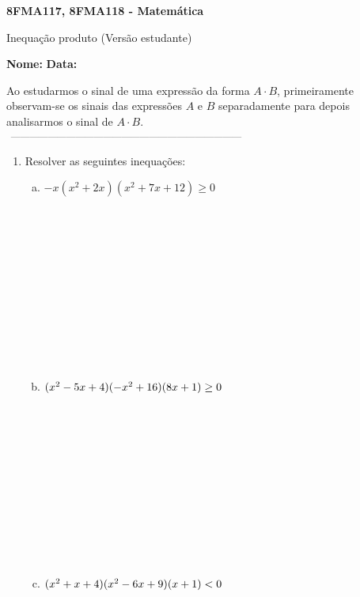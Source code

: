 \documentclass[a4paper,14pt]{article}
\begin{document}
	
	\noindent\textbf{8FMA117, 8FMA118 - Matemática} 
	
	\begin{center}Inequação produto (Versão estudante)
	\end{center}
	
	\noindent\textbf{Nome:} \underline{\hspace{10cm}}
	\noindent\textbf{Data:} \underline{\hspace{4cm}}
	
    \begin{multicols}{2}
    	\noindent Ao estudarmos o sinal de uma expressão da forma $A \cdot B$, primeiramente observam-se os sinais das expressões $A$ e $B$ separadamente para depois analisarmos o sinal de $A \cdot B$. \\
    	\noindent\textsubscript{~---------------------------------------------------------------------------}
    	\begin{enumerate}
    		\item Resolver as seguintes inequações:
    		\begin{enumerate}[a)]
    			\item $-x(x^2 + 2x)(x^2 + 7x + 12) \geq 0$ \\\\\\\\\\\\\\\\\\\\\\\\
    			\item $(x^2 - 5x + 4)(-x^2 + 16)\\(8x + 1) \geq 0$
    			\\\\\\\\\\\\\\\\\\\\\\\\
    			\item $(x^2 + x + 4)(x^2 - 6x + 9)\\(x + 1) < 0$ 

\end{enumerate}
\end{enumerate}
\end{multicols}
\end{document}
